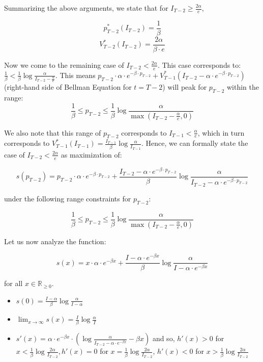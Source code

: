 \documentclass[12pt]{amsart}
\begin{document}
Summarizing the above arguments, we state that for $I_{T-2} \geq \frac {2 \alpha} e$,

$$p_{T-2}^*(I_{T-2}) = \frac 1 \beta$$
$$V_{T-2}^*(I_{T-2}) = \frac {2 \alpha} {\beta \cdot e}$$

Now we come to the remaining case of $I_{T-2} <  \frac {2 \alpha} e$. This case corresponds to: $\frac 1 \beta < \frac 1 \beta \log \frac \alpha {I_{T-2} - \frac \alpha e}$. This means $p_{T-2} \cdot \alpha \cdot e^{-\beta \cdot p_{T-2}}  + V_{T-1}^*(I_{T-2} - \alpha \cdot e^{-\beta \cdot p_{T-2}})$ (right-hand side of Bellman Equation for $t=T-2$) will peak for $p_{T-2}$ within the range: 
$$\frac 1 \beta \leq p_{T-2} \leq \frac 1 \beta \log \frac \alpha {\max(I_{T-2} - \frac \alpha e, 0)}$$

We also note that this range of $p_{T-2}$ corresponds to $I_{T-1} < \frac \alpha e$, which in turn corresponds to $V_{T-1}^*(I_{T-1}) = \frac {I_{T-1}} {\beta} \log{ \frac {\alpha} {I_{T-1}}}$. Hence, we can formally state the case of $I_{T-2} <  \frac {2 \alpha} e$ as maximization of:

$$s(p_{T-2}) = p_{T-2} \cdot \alpha \cdot e^{-\beta \cdot p_{T-2}}  + \frac {I_{T-2} - \alpha \cdot e^{-\beta \cdot p_{T-2}}} {\beta} \log{ \frac {\alpha} {I_{T-2} - \alpha \cdot e^{-\beta \cdot p_{T-2}}}}$$

under the following range constraints for $p_{T-2}$:

$$\frac 1 \beta \leq p_{T-2} \leq \frac 1 \beta \log \frac \alpha {\max(I_{T-2} - \frac \alpha e, 0)}$$

Let us now analyze the function:

$$s(x) = x \cdot \alpha \cdot e^{-\beta x}  + \frac {I - \alpha \cdot e^{-\beta x}} {\beta} \log \frac {\alpha} {I - \alpha \cdot e^{-\beta x}}$$

for all $x \in \mathbb{R}_{\geq 0}$.

\begin{itemize}
\item $s(0) = \frac {I - \alpha} {\beta} \log \frac {\alpha} {I - \alpha}$
\item $\lim_{x \to \infty} s(x) = \frac I {\beta} \log \frac {\alpha} I$
\item $s'(x) = \alpha \cdot e^{-\beta x} \cdot (\log \frac \alpha {I_{T-2} - \alpha \cdot e^{-\beta x}} - \beta x)$ and so, $h'(x) > 0$ for $x < \frac 1 \beta \log \frac {2 \alpha} {I_{T-2}}, h'(x) = 0$ for $x = \frac 1 \beta \log \frac {2 \alpha} {I_{T-2}}$, $h'(x) < 0$ for $x > \frac 1 \beta \log \frac {2 \alpha} {I_{T-2}}$
\end{itemize}
\end{document}
